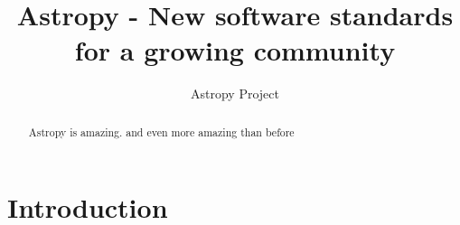 \documentclass[modern]{aastex61}
\begin{document}
\draft{\today}

\title{Astropy - New software standards for a growing community}



\author{Astropy Project}

\begin{abstract}

Astropy is amazing. and even more amazing than before

\end{abstract}

\keywords{}

\section{Introduction} \label{sec:intro}
\end{document}
